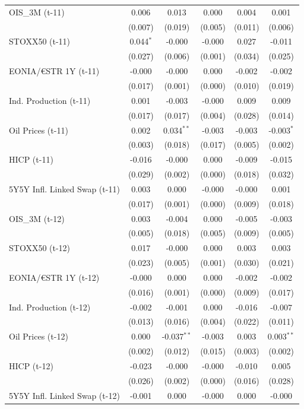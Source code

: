 \begin{longtable}[t]{lccccc}
OIS\_3M (t-11) & 0.006 & 0.013 & 0.000 & 0.004 & 0.001\\
 & (0.007) & (0.019) & (0.005) & (0.011) & (0.006)\\
STOXX50 (t-11) & 0.044$^{*}$ & -0.000 & -0.000 & 0.027 & -0.011\\
 & (0.027) & (0.006) & (0.001) & (0.034) & (0.025)\\
EONIA/€STR 1Y (t-11) & -0.000 & -0.000 & 0.000 & -0.002 & -0.002\\
 & (0.017) & (0.001) & (0.000) & (0.010) & (0.019)\\
Ind. Production (t-11) & 0.001 & -0.003 & -0.000 & 0.009 & 0.009\\
 & (0.017) & (0.017) & (0.004) & (0.028) & (0.014)\\
Oil Prices (t-11) & 0.002 & 0.034$^{**}$ & -0.003 & -0.003 & -0.003$^{*}$\\
 & (0.003) & (0.018) & (0.017) & (0.005) & (0.002)\\
HICP (t-11) & -0.016 & -0.000 & 0.000 & -0.009 & -0.015\\
 & (0.029) & (0.002) & (0.000) & (0.018) & (0.032)\\
5Y5Y Infl. Linked Swap (t-11) & 0.003 & 0.000 & -0.000 & -0.000 & 0.001\\
 & (0.017) & (0.001) & (0.000) & (0.009) & (0.018)\\
OIS\_3M (t-12) & 0.003 & -0.004 & 0.000 & -0.005 & -0.003\\
 & (0.005) & (0.018) & (0.005) & (0.009) & (0.005)\\
STOXX50 (t-12) & 0.017 & -0.000 & 0.000 & 0.003 & 0.003\\
 & (0.023) & (0.005) & (0.001) & (0.030) & (0.021)\\
EONIA/€STR 1Y (t-12) & -0.000 & 0.000 & 0.000 & -0.002 & -0.002\\
 & (0.016) & (0.001) & (0.000) & (0.009) & (0.017)\\
Ind. Production (t-12) & -0.002 & -0.001 & 0.000 & -0.016 & -0.007\\
 & (0.013) & (0.016) & (0.004) & (0.022) & (0.011)\\
Oil Prices (t-12) & 0.000 & -0.037$^{**}$ & -0.003 & 0.003 & 0.003$^{**}$\\
 & (0.002) & (0.012) & (0.015) & (0.003) & (0.002)\\
HICP (t-12) & -0.023 & -0.000 & -0.000 & -0.010 & 0.005\\
 & (0.026) & (0.002) & (0.000) & (0.016) & (0.028)\\
5Y5Y Infl. Linked Swap (t-12) & -0.001 & 0.000 & -0.000 & 0.000 & -0.000\\

\end{longtable}
